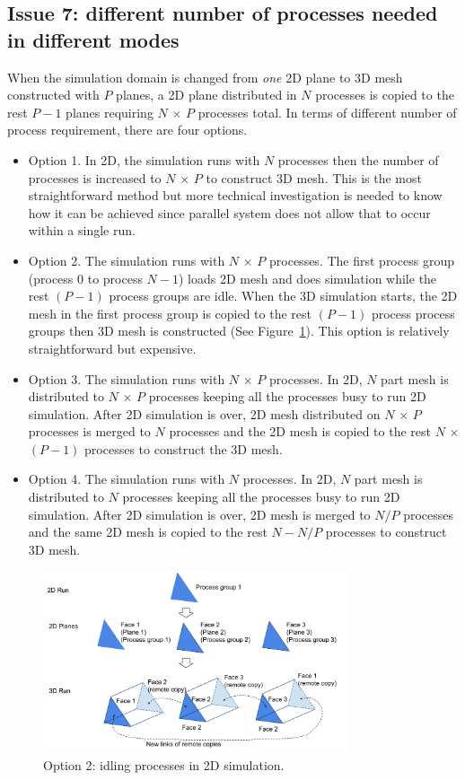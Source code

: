 \documentclass[11pt]{article}  %
\begin{document}
\subsection{Issue 7: different number of processes needed in different modes}
When the simulation domain is changed from \emph{one} 2D plane to 3D mesh constructed with $P$ planes, a 2D plane distributed in $N$ processes is copied to the rest $P-1$ planes requiring $N$ $\times$ $P$ processes total. In terms of different number of process requirement, there are four options.
\begin{itemize}
\item{Option 1.} In 2D, the simulation runs with $N$ processes then the number of processes is increased to $N$ $\times$ $P$ to construct 3D mesh. This is the most straightforward method but more technical investigation is needed to know how it can be achieved since parallel system does not allow that to occur within a single run. 
\item{Option 2.} The simulation runs with $N$ $\times$ $P$ processes. The first process group (process $0$ to process $N-1$) loads 2D mesh and does simulation while the rest $(P-1)$ process groups are idle. When the 3D simulation starts, the 2D mesh in the first process group is copied to the rest $(P-1)$ process process groups then 3D mesh is constructed (See Figure~\ref{fig:wedgePlane}). This option is relatively straightforward but expensive.
\item{Option 3.} The simulation runs with $N$ $\times$ $P$ processes. In 2D, $N$ part mesh is distributed to $N$ $\times$ $P$ processes keeping all the processes busy to run 2D simulation. After 2D simulation is over, 2D mesh distributed on $N$ $\times$ $P$ processes is merged to $N$ processes and the 2D mesh is copied to the rest $N$ $\times$ $(P-1)$ processes to construct the 3D mesh. 
\item{Option 4.} The simulation runs with $N$ processes. In 2D, $N$ part mesh is distributed to $N$ processes keeping all the processes busy to run 2D simulation. After 2D simulation is over, 2D mesh is merged to $N/P$ processes and the same 2D mesh is copied to the rest $N-N/P$ processes to construct 3D mesh.  
\end{itemize}

\begin{figure}
\center
\includegraphics[width=0.8\textwidth]{fig/wedgePlane.png}
\caption{\small{Option 2: idling processes in 2D simulation.}} 
\label{fig:wedgePlane}
\end{figure}
\end{document}
